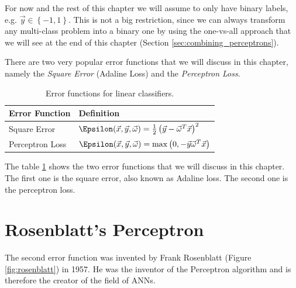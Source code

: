 For now and the rest of this chapter we will assume to only have binary labels, e.g. $\vec{y} \in \left\{-1, 1\right\}$. This is not a big restriction, since we can always transform
any multi-class problem into a binary one by using the one-vs-all approach that we will see at the end of this chapter (Section \ref{sec:combining_perceptrons}).

There are two very popular error functions that we will discuss in this chapter, namely the \textit{Square Error} (Adaline Loss) and the \textit{Perceptron Loss}.

\begin{table}[h]
  \centering
  \begin{tabular}{|l|l|}
    \hline
    \textbf{Error Function} & \textbf{Definition}\\
    \hline
    Square Error & $\Epsilon(\vec{x}, \vec{y}, \vec{\omega}) = \frac{1}{2} \left(\vec{y} - \vec{\omega}^T \vec{x}\right)^2$\\
    \hline
    Perceptron Loss & $\Epsilon(\vec{x}, \vec{y}, \vec{\omega}) = \max\left(0, -\vec{y} \vec{\omega}^T \vec{x}\right)$\\
    \hline
  \end{tabular}
  \caption{Error functions for linear classifiers.}
  \label{tab:error_functions}
\end{table}
The table \ref{tab:error_functions} shows the two error functions that we will discuss in this chapter. The first one is the square error, also known as Adaline loss. The second one is the perceptron loss.

\section{Rosenblatt's Perceptron}
The second error function was invented by Frank Rosenblatt (Figure \ref{fig:rosenblatt}) in 1957.
He was the inventor of the Perceptron algorithm and is therefore the creator of the field of ANNs.

